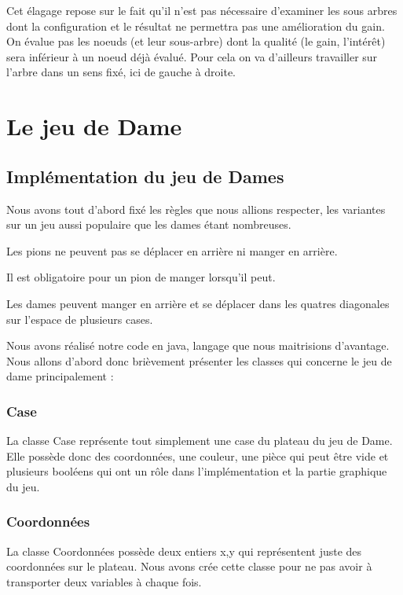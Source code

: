\documentclass[12,french]{report}
\begin{document}
Cet élagage repose sur le fait qu'il n'est pas nécessaire d'examiner
les sous arbres dont la configuration et le résultat ne permettra
pas une amélioration du gain. On évalue pas les noeuds (et leur sous-arbre)
dont la qualité (le gain, l'intérêt) sera inférieur à un noeud déjà
évalué. Pour cela on va d'ailleurs travailler sur l'arbre dans un
sens fixé, ici de gauche à droite. 


\chapter{Le jeu de Dame}

\section{Implémentation du jeu de Dames}

Nous avons tout d'abord fixé les règles que nous allions respecter,
les variantes sur un jeu aussi populaire que les dames étant nombreuses.

Les pions ne peuvent pas se déplacer en arrière ni manger en arrière. 

Il est obligatoire pour un pion de manger lorsqu'il peut.

Les dames peuvent manger en arrière et se déplacer dans les quatres
diagonales sur l'espace de plusieurs cases. 

Nous avons réalisé notre code en java, langage que nous maitrisions
d'avantage. Nous allons d'abord donc brièvement présenter les classes qui concerne le jeu de dame principalement :

\subsection{Case}

La classe Case représente tout simplement une case du plateau du jeu de Dame. Elle possède donc des coordonnées, une couleur, une pièce qui peut être vide et plusieurs booléens qui ont un rôle dans l'implémentation et la partie graphique du jeu.
  
\subsection{Coordonnées}

La classe Coordonnées possède deux entiers x,y qui représentent juste des coordonnées sur le plateau. Nous avons crée cette classe pour ne pas avoir à transporter deux variables à chaque fois.
\end{document}
